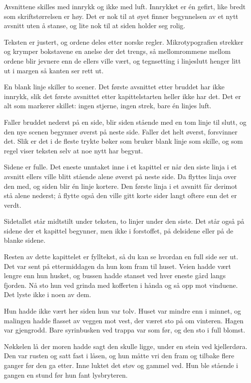 \documentclass[12pt,twoside]{book}
\begin{document}
Avsnittene skilles med innrykk og ikke med luft. Innrykket er én gefirt, like bredt som skriftstørrelsen er høy. Det er nok til at øyet finner begynnelsen av et nytt avsnitt uten å stanse, og lite nok til at siden holder seg rolig.

Teksten er justert, og ordene deles etter norske regler. Mikrotypografien strekker og krymper bokstavene en anelse der det trengs, så mellomrommene mellom ordene blir jevnere enn de ellers ville vært, og tegnsetting i linjeslutt henger litt ut i margen så kanten ser rett ut.

\scenebrudd

En blank linje skiller to scener. Det første avsnittet etter bruddet har ikke innrykk, slik det første avsnittet etter kapittelstarten heller ikke har det. Det er alt som markerer skillet: ingen stjerne, ingen strek, bare én linjes luft.

Faller bruddet nederst på en side, blir siden stående med en tom linje til slutt, og den nye scenen begynner øverst på neste side. Faller det helt øverst, forsvinner det. Slik er det i de fleste trykte bøker som bruker blank linje som skille, og som regel viser teksten selv at noe nytt har begynt.

Sidene er fulle. Det eneste unntaket inne i et kapittel er når den siste linja i et avsnitt ellers ville blitt stående alene øverst på neste side. Da flyttes linja over den med, og siden blir én linje kortere. Den første linja i et avsnitt får derimot stå alene nederst; å flytte også den ville gitt korte sider langt oftere enn det er verdt.

Sidetallet står midtstilt under teksten, to linjer under den siste. Det står også på sidene der et kapittel begynner, men ikke i forstoffet, på delsidene eller på de blanke sidene.

Resten av dette kapittelet er fylltekst, så du kan se hvordan en full side ser ut. Det var sent på ettermiddagen da hun kom fram til huset. Veien hadde vært lengre enn hun husket, og bussen hadde stanset ved hver eneste gård langs fjorden. Nå sto hun ved grinda med kofferten i hånda og så opp mot vinduene. Det lyste ikke i noen av dem.

Hun hadde ikke vært her siden hun var tolv. Huset var mindre enn i minnet, og malingen hadde flasset av veggen mot vest, der været sto på om vinteren. Hagen var gjengrodd. Bare syrinbusken ved trappa var som før, og den sto i full blomst.

Nøkkelen lå der moren hadde sagt den skulle ligge, under en stein ved kjellerdøra. Den var rusten og satt fast i låsen, og hun måtte vri den fram og tilbake flere ganger før den ga etter. Inne luktet det støv og gammel ved. Hun ble stående i gangen en stund før hun fant lysbryteren.
\end{document}
